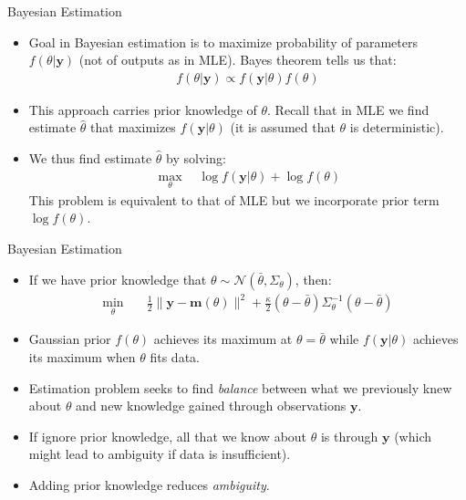 \documentclass[9pt]{beamer}
\begin{document}
%
\begin{frame}{Bayesian Estimation}

\begin{itemize}
\setlength{\itemsep}{10pt}
\item Goal in Bayesian estimation is to maximize probability of parameters $f(\theta|\mathbf{y})$ (not of outputs as in MLE). Bayes theorem tells us that:
\begin{align*}
f(\theta|\mathbf{y})\propto f(\mathbf{y}|\theta)f(\theta)
\end{align*}
\item This approach carries prior knowledge of $\theta$.  Recall that in MLE we find estimate $\hat{\theta}$ that maximizes $f(\mathbf{y}|\theta)$ (it is assumed that $\theta$ is deterministic). 

\item We thus find estimate $\hat{\theta}$ by solving:
\begin{align*}
\max_\theta\quad  \log f(\mathbf{y}|\theta)+\log f(\theta)
\end{align*}
This problem is equivalent to that of MLE but we incorporate prior term $\log f(\theta)$. 
\end{itemize}

\end{frame}

%
\begin{frame}{Bayesian Estimation}

\begin{itemize}
\setlength{\itemsep}{10pt}
\item If we have prior knowledge that $\theta\sim \mathcal{N}(\bar{\theta},\Sigma_\theta)$, then: 
\begin{align*}
\min_{\theta}& \quad \frac{1}{2}\|\mathbf{y}- \mathbf{m}(\theta)\|^2+\frac{\kappa}{2}(\theta-\bar{\theta})\Sigma_\theta^{-1}(\theta-\bar{\theta})  
\end{align*}
\item Gaussian prior $f(\theta)$ achieves its maximum at $\theta=\bar{\theta}$ while $f(\mathbf{y}|\theta)$ achieves its maximum when $\theta$ fits data. 
\item Estimation problem seeks to find {\em balance} between what we previously knew about $\theta$ and new knowledge gained through observations $\mathbf{y}$. 
\item If ignore prior knowledge, all that we know about $\theta$ is through $\mathbf{y}$ (which might lead to ambiguity if data is insufficient). 
\item Adding prior knowledge reduces {\em ambiguity}. 
\end{itemize}

\end{frame}
\end{document}
